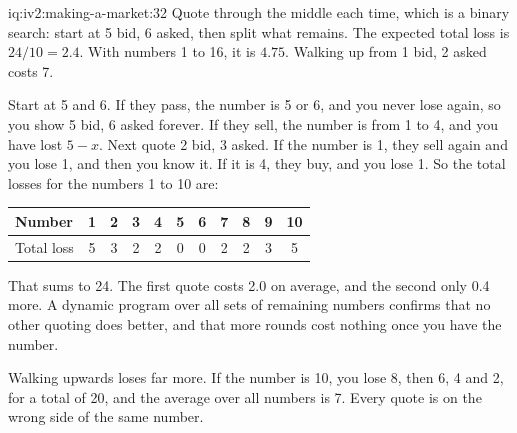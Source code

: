 \begin{solution}{iq:iv2:making-a-market:32}
Quote through the middle each time, which is a binary search: start at 5 bid, 6 asked, then split what remains. The expected total loss is $24/10 = 2.4$. With numbers 1 to 16, it is $4.75$. Walking up from 1 bid, 2 asked costs 7.

Start at 5 and 6. If they pass, the number is 5 or 6, and you never lose again, so you show 5 bid, 6 asked forever. If they sell, the number is from 1 to 4, and you have lost $5 - x$. Next quote 2 bid, 3 asked. If the number is 1, they sell again and you lose 1, and then you know it. If it is 4, they buy, and you lose 1. So the total losses for the numbers 1 to 10 are:
\begin{center}\small
\begin{tabular}{@{}l*{10}{c}@{}}
Number & 1 & 2 & 3 & 4 & 5 & 6 & 7 & 8 & 9 & 10 \\ \hline
Total loss & 5 & 3 & 2 & 2 & 0 & 0 & 2 & 2 & 3 & 5
\end{tabular}
\end{center}
That sums to 24. The first quote costs 2.0 on average, and the second only 0.4 more. A dynamic program over all sets of remaining numbers confirms that no other quoting does better, and that more rounds cost nothing once you have the number.

Walking upwards loses far more. If the number is 10, you lose 8, then 6, 4 and 2, for a total of 20, and the average over all numbers is 7. Every quote is on the wrong side of the same number.

\end{solution}

